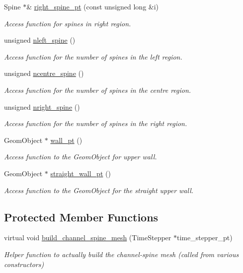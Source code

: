 \begin{DoxyCompactItemize}
Spine $\ast$\& \hyperlink{classoomph_1_1ChannelSpineMesh_a78a52a2e61a76bff0fa74b3fd2583092}{right\+\_\+spine\+\_\+pt} (const unsigned long \&i)
\begin{DoxyCompactList}\small\item\em Access function for spines in right region. \end{DoxyCompactList}\item 
unsigned \hyperlink{classoomph_1_1ChannelSpineMesh_af5ae7133c9939b90779f0809143676bd}{nleft\+\_\+spine} ()
\begin{DoxyCompactList}\small\item\em Access function for the number of spines in the left region. \end{DoxyCompactList}\item 
unsigned \hyperlink{classoomph_1_1ChannelSpineMesh_a85fa0910148e6aa5d8a1995ece5feeae}{ncentre\+\_\+spine} ()
\begin{DoxyCompactList}\small\item\em Access function for the number of spines in the centre region. \end{DoxyCompactList}\item 
unsigned \hyperlink{classoomph_1_1ChannelSpineMesh_a48ee9b7736e6884ff41e2affd4094842}{nright\+\_\+spine} ()
\begin{DoxyCompactList}\small\item\em Access function for the number of spines in the right region. \end{DoxyCompactList}\item 
Geom\+Object $\ast$ \hyperlink{classoomph_1_1ChannelSpineMesh_a741893ef460f1275f1df43496bb7536c}{wall\+\_\+pt} ()
\begin{DoxyCompactList}\small\item\em Access function to the Geom\+Object for upper wall. \end{DoxyCompactList}\item 
Geom\+Object $\ast$ \hyperlink{classoomph_1_1ChannelSpineMesh_a54818e02db7026d39451f5f502e1cf11}{straight\+\_\+wall\+\_\+pt} ()
\begin{DoxyCompactList}\small\item\em Access function to the Geom\+Object for the straight upper wall. \end{DoxyCompactList}\end{DoxyCompactItemize}
\subsection*{Protected Member Functions}
\begin{DoxyCompactItemize}
\item 
virtual void \hyperlink{classoomph_1_1ChannelSpineMesh_a12eae5013f54ae04f9eb1cdffacf3955}{build\+\_\+channel\+\_\+spine\+\_\+mesh} (Time\+Stepper $\ast$time\+\_\+stepper\+\_\+pt)
\begin{DoxyCompactList}\small\item\em Helper function to actually build the channel-\/spine mesh (called from various constructors) \end{DoxyCompactList}\end{DoxyCompactItemize}
